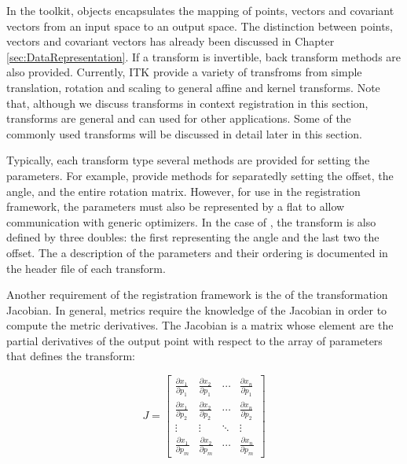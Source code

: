 In the toolkit,  objects encapsulates the mapping of
points, vectors and covariant vectors from an input space to an output space.
The distinction between points, vectors and covariant vectors has already
been discussed in Chapter \ref{sec:DataRepresentation}. If a transform is
invertible, back transform methods are also provided. Currently, 
ITK provide a variety of transfroms from simple translation, rotation and 
scaling to general affine and kernel transforms. Note that, although we
discuss transforms in context registration in this section, transforms
are general and can used for other applications. Some of the commonly used 
transforms will be discussed in detail later in this section.

Typically, each transform type several methods are provided for setting
the parameters. For example,  provide methods for
separatedly setting the offset, the angle, and the entire rotation matrix.
However, for use in the registration framework, the parameters must also
be represented by a flat  to allow communication
with generic optimizers. In the case of , the transform
is also defined by three doubles: the first representing the angle and 
the last two the offset. The a description of the parameters and their
ordering is documented in the header file of each transform.

Another requirement of the registration framework is the of the
transformation Jacobian. In general, metrics require the knowledge of 
the Jacobian in order to compute the metric derivatives. 
The Jacobian is a matrix whose element are the partial derivatives of the 
output point with respect to the array of parameters that defines the 
transform:

\begin{equation}
J=\left[ \begin{array}{cccc}
\frac{\partial x_{1}}{\partial p_{1}} & 
\frac{\partial x_{2}}{\partial p_{1}} & 
\cdots  & \frac{\partial x_{n}}{\partial p_{1}}\\
\frac{\partial x_{1}}{\partial p_{2}} & 
\frac{\partial x_{2}}{\partial p_{2}} & 
\cdots  & \frac{\partial x_{n}}{\partial p_{2}}\\
\vdots  & \vdots  & \ddots  & \vdots \\
\frac{\partial x_{1}}{\partial p_{m}} & 
\frac{\partial x_{2}}{\partial p_{m}} & 
\cdots  & \frac{\partial x_{n}}{\partial p_{m}}
\end{array}\right]
\end{equation}
 

